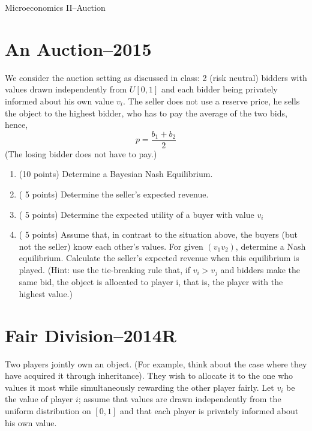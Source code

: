 \documentclass[a4paper]{article}
\begin{document}
\begin{center}
\LARGE{Microeconomics II--Auction}
\end{center}


\section*{An Auction--2015}
We consider the auction setting as discussed in class: 2 (risk neutral) bidders with values drawn independently from $U[0,1]$ and each bidder being privately informed about his own value $v_{i}$. The seller does not use a reserve price, he sells the object to the highest bidder, who has to pay the average of the two bids, hence, 
$$p = \frac{b_{1}+b_{2}}{2}$$
(The losing bidder does not have to pay.)
\begin{enumerate}
	\item (10 points) Determine a Bayesian Nash Equilibrium.
	\item   ( 5 points) Determine the seller's expected revenue.
	\item   ( 5 points) Determine the expected utility of a buyer with value $v_{i}$
	\item   ( 5 points) Assume that, in contrast to the situation above, the buyers (but not the seller) know each other's values. For given $(v_{1} v_{2})$, determine a Nash equilibrium. Calculate the seller's expected revenue when this equilibrium is played. (Hint: use the tie-breaking rule that, if $v_{i}>v_{j}$ and bidders make the same bid, the object is allocated to player i, that is, the player with the highest value.)
\end{enumerate}

\section*{Fair Division--2014R}
Two players jointly own an object. (For example, think about the case where they have acquired it through inheritance). They wish to allocate it to the one who values it most while simultaneously rewarding the other player fairly. Let $v_{i}$ be the value of player $i$; assume that values are drawn independently from the uniform distribution on $[0,1]$ and that each player is privately informed about his own value.
\end{document}
